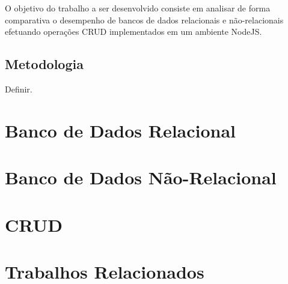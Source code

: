 \documentclass[a4paper,12pt,onecolumn,titlepage]{article}
\begin{document}
O objetivo do trabalho a ser desenvolvido consiste em analisar de forma comparativa o desempenho de bancos de dados relacionais e não-relacionais efetuando operações CRUD implementados em um ambiente NodeJS.

\subsection{Metodologia}
\label{subsec:metodologia}

Definir.


\section{Banco de Dados Relacional}
\label{sec:relacional}

\section{Banco de Dados Não-Relacional}
\label{sec:nao-relacional}

\section{CRUD}
\label{sec:crud}

\section{Trabalhos Relacionados}
\label{sec:relacionados}



\renewcommand{\refname}{Bibliografia}


\end{document}
